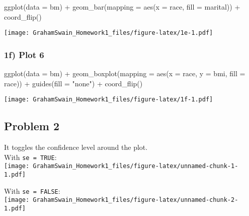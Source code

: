 \documentclass[
]{article}
\newenvironment{Shaded}{\begin{snugshade}}{\end{snugshade}}
\newcommand{\AttributeTok}[1]{\textcolor[rgb]{0.77,0.63,0.00}{#1}}
\newcommand{\FunctionTok}[1]{\textcolor[rgb]{0.00,0.00,0.00}{#1}}
\newcommand{\NormalTok}[1]{#1}
\newcommand{\SpecialCharTok}[1]{\textcolor[rgb]{0.00,0.00,0.00}{#1}}
\newcommand{\StringTok}[1]{\textcolor[rgb]{0.31,0.60,0.02}{#1}}
\begin{document}
\begin{Shaded}
\begin{Highlighting}[]
\FunctionTok{ggplot}\NormalTok{(}\AttributeTok{data =}\NormalTok{ bm) }\SpecialCharTok{+}
  \FunctionTok{geom\_bar}\NormalTok{(}\AttributeTok{mapping =} \FunctionTok{aes}\NormalTok{(}\AttributeTok{x =}\NormalTok{ race, }\AttributeTok{fill =}\NormalTok{ marital)) }\SpecialCharTok{+}
  \FunctionTok{coord\_flip}\NormalTok{()}
\end{Highlighting}
\end{Shaded}

\texttt{[image: GrahamSwain\_Homework1\_files/figure-latex/1e-1.pdf]}

\hypertarget{f-plot-6}{%
\subsubsection{1f) Plot 6}\label{f-plot-6}}

\begin{Shaded}
\begin{Highlighting}[]
\FunctionTok{ggplot}\NormalTok{(}\AttributeTok{data =}\NormalTok{ bm) }\SpecialCharTok{+}
  \FunctionTok{geom\_boxplot}\NormalTok{(}\AttributeTok{mapping =} \FunctionTok{aes}\NormalTok{(}\AttributeTok{x =}\NormalTok{ race, }\AttributeTok{y =}\NormalTok{ bmi, }\AttributeTok{fill =}\NormalTok{ race)) }\SpecialCharTok{+}
  \FunctionTok{guides}\NormalTok{(}\AttributeTok{fill =} \StringTok{"none"}\NormalTok{) }\SpecialCharTok{+}
  \FunctionTok{coord\_flip}\NormalTok{()}
\end{Highlighting}
\end{Shaded}

\texttt{[image: GrahamSwain\_Homework1\_files/figure-latex/1f-1.pdf]}

\hypertarget{problem-2}{%
\subsection{Problem 2}\label{problem-2}}

It toggles the confidence level around the plot.\\
With \texttt{se\ =\ TRUE}:\\
\texttt{[image: GrahamSwain\_Homework1\_files/figure-latex/unnamed-chunk-1-1.pdf]}

With \texttt{se\ =\ FALSE}:\\
\texttt{[image: GrahamSwain\_Homework1\_files/figure-latex/unnamed-chunk-2-1.pdf]}
\end{document}
